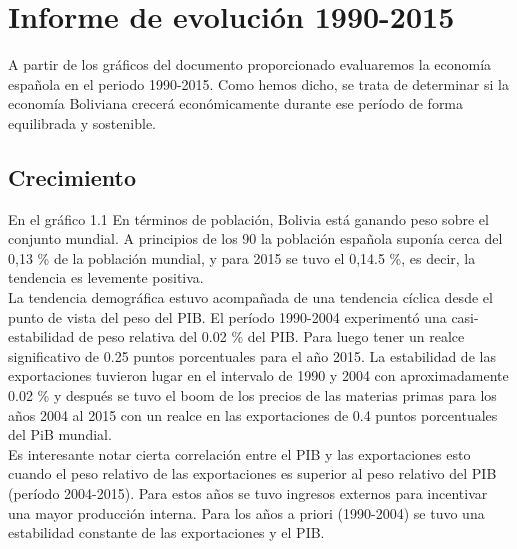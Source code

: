 \section{Informe de evolución 1990-2015}
A partir de los gráficos del documento proporcionado evaluaremos la economía española en el periodo 1990-2015. Como hemos dicho, se trata de determinar si la economía Boliviana crecerá económicamente durante ese período de forma equilibrada y sostenible.

    \subsection{Crecimiento}
    En el gráfico 1.1  En términos de población, Bolivia está ganando peso sobre el conjunto mundial. A principios de los 90 la población española suponía cerca del 0,13 \% de la población mundial, y para 2015 se tuvo el 0,14.5 \%, es decir, la tendencia es levemente positiva.\\
    La tendencia demográfica estuvo acompañada de una tendencia cíclica desde el punto de vista del peso del PIB. El período 1990-2004 experimentó una casi-estabilidad de peso relativa del 0.02 \% del PIB. Para luego tener un realce significativo de 0.25 puntos porcentuales para el año 2015. La estabilidad de las exportaciones tuvieron lugar en el intervalo de 1990 y 2004 con aproximadamente 0.02 \% y después se tuvo el boom de los precios de las materias primas para los años 2004 al 2015 con un realce en las exportaciones de 0.4 puntos porcentuales del PiB mundial.\\
    Es interesante notar cierta correlación entre el PIB y las exportaciones esto cuando el peso relativo de las exportaciones es superior al peso relativo del PIB (período 2004-2015). Para estos años se tuvo ingresos externos para incentivar una mayor producción interna.  Para los años a priori (1990-2004) se tuvo una estabilidad constante de las exportaciones y el PIB.\\

